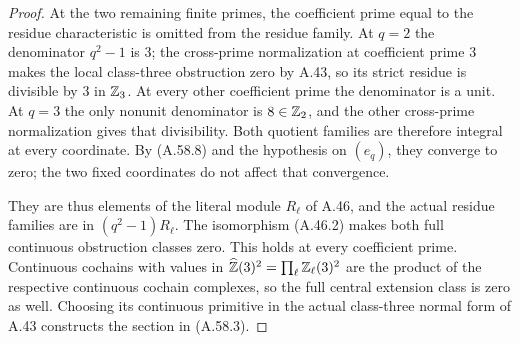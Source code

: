 \begin{proof}
At the two remaining finite primes, the coefficient prime
equal to the residue characteristic is omitted from the
residue family.  At $q=2$ the denominator $q^2-1$ is $3$;
the cross-prime normalization at coefficient prime $3$
makes the local class-three obstruction zero by A.43,
so its strict residue is divisible by $3$ in $\mathbb Z_3$.
At every other coefficient prime the denominator is a unit.
At $q=3$ the only nonunit denominator is $8\in\mathbb Z_2$,
and the other cross-prime normalization gives that
divisibility.  Both quotient families are therefore integral
at every coordinate.  By (A.58.8) and the hypothesis on
$(e_q)$, they converge to zero; the two fixed coordinates
do not affect that convergence.

They are thus elements of the literal module $R_\ell$ of
A.46, and the actual residue families are in
$(q^2-1)R_\ell$.  The isomorphism (A.46.2) makes both full
continuous obstruction classes zero.  This holds at every
coefficient prime.  Continuous cochains with values in
$\widehat{\mathbb Z}(3)^2=\prod_\ell\mathbb Z_\ell(3)^2$ are the product
of the respective continuous cochain complexes, so the
full central extension class is zero as well.  Choosing its
continuous primitive in the actual class-three normal form
of A.43 constructs the section in (A.58.3).
\end{proof}
